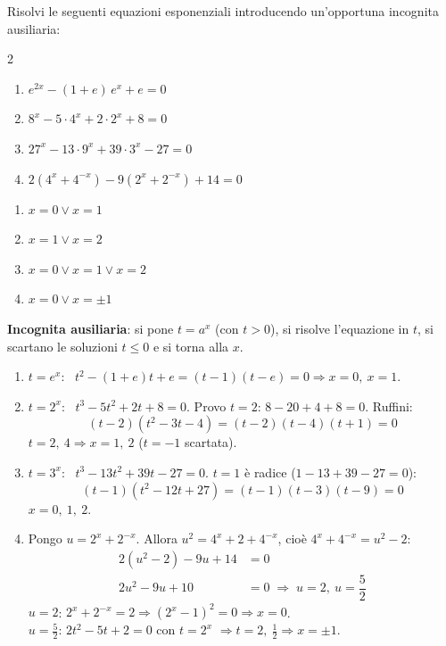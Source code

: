 
\begin{question}[ID=3.11, subtitle={Equazioni con sostituzione: grado superiore al secondo}, difficulty=difficile, tags={equazioni, esponenziali, sostituzione}]
Risolvi le seguenti equazioni esponenziali introducendo un'opportuna incognita ausiliaria:
\begin{center}\begin{minipage}{0.92\linewidth}
\begin{multicols}{2}
\begin{enumerate}[leftmargin=3.2cm]
\item $e^{2x} - (1+e)\,e^{x} + e = 0$
\item $8^{x} - 5 \cdot 4^{x} + 2 \cdot 2^{x} + 8 = 0$
\item $27^{x} - 13 \cdot 9^{x} + 39 \cdot 3^{x} - 27 = 0$
\item $2\left(4^{x}+4^{-x}\right) - 9\left(2^{x}+2^{-x}\right) + 14 = 0$
\end{enumerate}
\end{multicols}
\end{minipage}\end{center}
\begin{solution}
\begin{enumerate}
    \item $x=0\vee x=1$
    \item $x=1\vee x=2$
    \item $x=0\vee x=1\vee x=2$
    \item $x=0\vee x=\pm1$
\end{enumerate}
\end{solution}
\begin{explanation}
\textbf{Incognita ausiliaria}: si pone $t=a^x$ (con $t>0$), si risolve l'equazione in $t$, si scartano le soluzioni $t\leq0$ e si torna alla $x$.
\begin{enumerate}
    \item $t=e^x$: \ $t^2-(1+e)t+e=(t-1)(t-e)=0 \Rightarrow x=0,\ x=1$.
    \item $t=2^x$: \ $t^3-5t^2+2t+8=0$. Provo $t=2$: $8-20+4+8=0$. Ruffini:
    \[ (t-2)(t^2-3t-4)=(t-2)(t-4)(t+1)=0 \]
    $t=2,\ 4 \Rightarrow x=1,\ 2$ ($t=-1$ scartata).
    \item $t=3^x$: \ $t^3-13t^2+39t-27=0$. $t=1$ è radice ($1-13+39-27=0$):
    \[ (t-1)(t^2-12t+27)=(t-1)(t-3)(t-9)=0 \]
    $x=0,\ 1,\ 2$.
    \item Pongo $u=2^x+2^{-x}$. Allora $u^2=4^x+2+4^{-x}$, cioè $4^x+4^{-x}=u^2-2$:
    \[\begin{aligned}
    2(u^2-2)-9u+14 &= 0\\
    2u^2-9u+10 &= 0 \;\Rightarrow\; u=2,\ u=\dfrac52
    \end{aligned}\]
    $u=2$: $2^x+2^{-x}=2 \Rightarrow (2^x-1)^2=0 \Rightarrow x=0$. \\
    $u=\tfrac52$: $2t^2-5t+2=0$ con $t=2^x$ $\Rightarrow t=2,\ \tfrac12 \Rightarrow x=\pm1$.
\end{enumerate}
\end{explanation}
\end{question}

